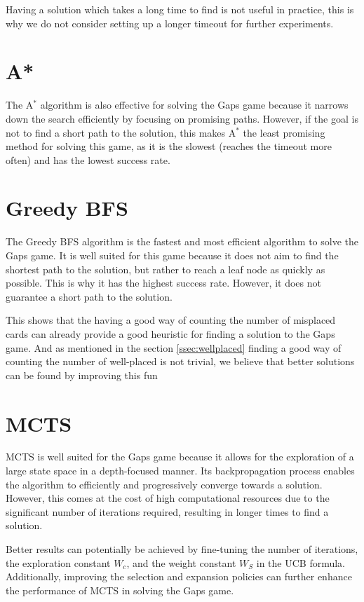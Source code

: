 Having a solution which takes a long time to find is not useful in practice, this is why we do not consider setting up a longer timeout for further experiments.

\section{A*}
The A$^*$ algorithm is also effective for solving the Gaps game because it narrows down the search efficiently by focusing on promising paths. However, if the goal is not to find a short path to the solution, this makes A$^*$ the least promising method for solving this game, as it is the slowest (reaches the timeout more often) and has the lowest success rate.

\section{Greedy BFS}
The Greedy BFS algorithm is the fastest and most efficient algorithm to solve the Gaps game. It is well suited for this game because it does not aim to find the shortest path to the solution, but rather to reach a leaf node as quickly as possible. This is why it has the highest success rate. However, it does not guarantee a short path to the solution.

This shows that the having a good way of counting the number of misplaced cards can already provide a good heuristic for finding a solution to the Gaps game. And as mentioned in the section \ref{ssec:wellplaced} finding a good way of counting the number of well-placed is not trivial, we believe that better solutions can be found by improving this fun

\section{MCTS}
MCTS is well suited for the Gaps game because it allows for the exploration of a large state space in a depth-focused manner. Its backpropagation process enables the algorithm to efficiently and progressively converge towards a solution. However, this comes at the cost of high computational resources due to the significant number of iterations required, resulting in longer times to find a solution.

Better results can potentially be achieved by fine-tuning the number of iterations, the exploration constant $W_c$, and the weight constant $W_S$ in the UCB formula. Additionally, improving the selection and expansion policies can further enhance the performance of MCTS in solving the Gaps game.


